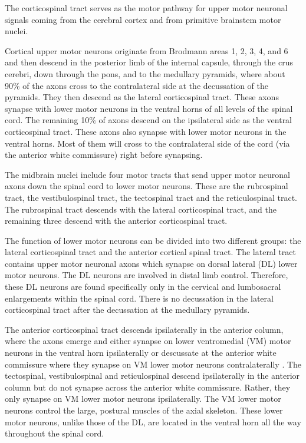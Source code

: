 The corticospinal tract serves as the motor pathway for upper motor neuronal signals coming from the cerebral cortex and from primitive brainstem motor nuclei.

Cortical upper motor neurons originate from Brodmann areas 1, 2, 3, 4, and 6 and then descend in the posterior limb of the internal capsule, through the crus cerebri, down through the pons, and to the medullary pyramids, where about 90\% of the axons cross to the contralateral side at the decussation of the pyramids. They then descend as the lateral corticospinal tract. These axons synapse with lower motor neurons in the ventral horns of all levels of the spinal cord. The remaining 10\% of axons descend on the ipsilateral side as the ventral corticospinal tract. These axons also synapse with lower motor neurons in the ventral horns. Most of them will cross to the contralateral side of the cord (via the anterior white commissure) right before synapsing.

The midbrain nuclei include four motor tracts that send upper motor neuronal axons down the spinal cord to lower motor neurons. These are the rubrospinal tract, the vestibulospinal tract, the tectospinal tract and the reticulospinal tract. The rubrospinal tract descends with the lateral corticospinal tract, and the remaining three descend with the anterior corticospinal tract.

The function of lower motor neurons can be divided into two different groups: the lateral corticospinal tract and the anterior cortical spinal tract. The lateral tract contains upper motor neuronal axons which synapse on dorsal lateral (DL) lower motor neurons. The DL neurons are involved in distal limb control. Therefore, these DL neurons are found specifically only in the cervical and lumbosacral enlargements within the spinal cord. There is no decussation in the lateral corticospinal tract after the decussation at the medullary pyramids.

The anterior corticospinal tract descends ipsilaterally in the anterior column, where the axons emerge and either synapse on lower ventromedial (VM) motor neurons in the ventral horn ipsilaterally or descussate at the anterior white commissure where they synapse on VM lower motor neurons contralaterally . The tectospinal, vestibulospinal and reticulospinal descend ipsilaterally in the anterior column but do not synapse across the anterior white commissure. Rather, they only synapse on VM lower motor neurons ipsilaterally. The VM lower motor neurons control the large, postural muscles of the axial skeleton. These lower motor neurons, unlike those of the DL, are located in the ventral horn all the way throughout the spinal cord.


